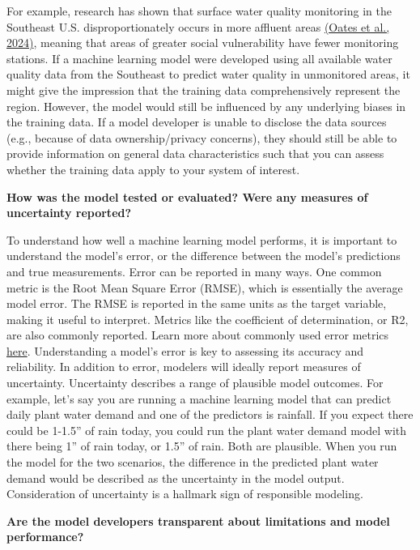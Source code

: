 \documentclass[
]{book}
\begin{document}
For example, research has shown that surface water quality monitoring in the Southeast U.S. disproportionately occurs in more affluent areas \href{https://doi.org/10.22541/essoar.172191636.66550095/v2}{(Oates et al., 2024)}, meaning that areas of greater social vulnerability have fewer monitoring stations. If a machine learning model were developed using all available water quality data from the Southeast to predict water quality in unmonitored areas, it might give the impression that the training data comprehensively represent the region. However, the model would still be influenced by any underlying biases in the training data. If a model developer is unable to disclose the data sources (e.g., because of data ownership/privacy concerns), they should still be able to provide information on general data characteristics such that you can assess whether the training data apply to your system of interest.

\textbf{How was the model tested or evaluated? Were any measures of uncertainty reported?}

To understand how well a machine learning model performs, it is important to understand the model's error, or the difference between the model's predictions and true measurements. Error can be reported in many ways. One common metric is the Root Mean Square Error (RMSE), which is essentially the average model error. The RMSE is reported in the same units as the target variable, making it useful to interpret. Metrics like the coefficient of determination, or R2, are also commonly reported. Learn more about commonly used error metrics \href{https://medium.com/@brandon93.w/regression-model-evaluation-metrics-r-squared-adjusted-r-squared-mse-rmse-and-mae-24dcc0e4cbd3}{here}. Understanding a model's error is key to assessing its accuracy and reliability. In addition to error, modelers will ideally report measures of uncertainty. Uncertainty describes a range of plausible model outcomes. For example, let's say you are running a machine learning model that can predict daily plant water demand and one of the predictors is rainfall. If you expect there could be 1-1.5'' of rain today, you could run the plant water demand model with there being 1'' of rain today, or 1.5'' of rain. Both are plausible. When you run the model for the two scenarios, the difference in the predicted plant water demand would be described as the uncertainty in the model output. Consideration of uncertainty is a hallmark sign of responsible modeling.

\textbf{Are the model developers transparent about limitations and model performance?}
\end{document}
